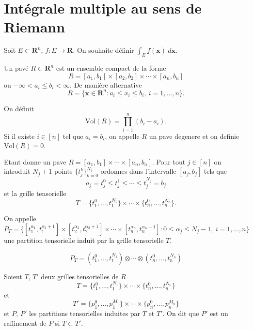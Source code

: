 \chapter{Intégrale multiple au sens de Riemann}
Soit $E\subset \mathbf{R}^{n}$, $f:E\to \mathbf{R}$. On souhaite définir $\int _{E}f(\boldsymbol{x})~d\boldsymbol{x}$.

\begin{definition}
Un pavé $R\subset \mathbf{R}^{n}$ est un ensemble compact de la forme 
$$
R=[a_{1},b_{1}]\times[a_{2},b_{2}]\times \cdots\times[a_{n},b_{n}]
$$
ou $-\infty<a_{i}\le b_{i}<\infty$. De manière alternative
$$
R=\{ \boldsymbol{x}\in \mathbf{R}^{n}:a_{i}\le x_{i}\le b_{i},~i=1,\dots,n \}.
$$
\end{definition}
\begin{definition}
On définit 
$$
\mathrm{Vol}(R)=\prod_{i=1}^{n} (b_{i}-a_{i}).
$$
Si il existe $i\in [n]$ tel que $a_{i}=b_{i}$, on appelle $R$ un pave degenere et on definie $\mathrm{Vol}(R)=0$.
\end{definition}
\begin{definition}
Etant donne un pave $R=[a_{1},b_{1}]\times \cdots\times[a_{n},b_{n}]$. Pour tout $j\in [n]$ on introduit $N_{j}+1$ points $\{ t_{j}^{k} \}_{k=0}^{N_{j}}$ ordonnes dans l'intervalle $[a_{j},b_{j}]$ tels que 
$$
a_{j}=t_{j}^{0}\le t_{j}^{1}\le \cdots \le t_{j}^{N_{j}}=b_{j}
$$
et la grille tensorielle
$$
T=\{ t_{1}^{0},\dots,t_{1}^{N_{1}} \}\times \cdots\times \{ t_{n}^{0},\dots,t_{n}^{N_{n}} \}.
$$

On appelle
$$
P_{T}=\{ [t_{1}^{\alpha_{1}},t_{1}^{\alpha_{1}+1}]\times[t_{2}^{\alpha_{2}},t_{2}^{\alpha_{2}+1}]\times \cdots\times[t_{n}^{\alpha _{n}},t_{n}^{\alpha _{n}+1}]: 0\le \alpha _{j}\le N_{j}-1, ~i=1,\dots, n \}
$$
une partition tensorielle induit par la grille tensorielle $T$.
\end{definition}
\begin{notation}
$$
P_{T}=(t_{1}^{0},\dots,t_{1}^{N_{1}})\otimes \cdots\otimes (t_{n}^{0},\dots,t_{n}^{N_{n}})
$$
\end{notation}
\begin{definition}
Soient $T$, $T'$ deux grilles tensorielles de $R$ 
$$
T=\{ t_{1}^{0},\dots,t_{1}^{N_{1}} \}\times \cdots\times \{ t_{n}^{0},\dots,t_{n}^{N_{n}} \}
$$
et
$$
T'=\{ p_{1}^{0},\dots,p_{1}^{M_{1}} \}\times \cdots\times \{ p_{n}^{0},\dots,p_{n}^{M_{n}} \}
$$
et $P$, $P'$ les partitions tensorielles induites par $T$ et $T'$. On dit que $P'$ est un raffinement de $P$ si $T\subset T'$.
\end{definition}
